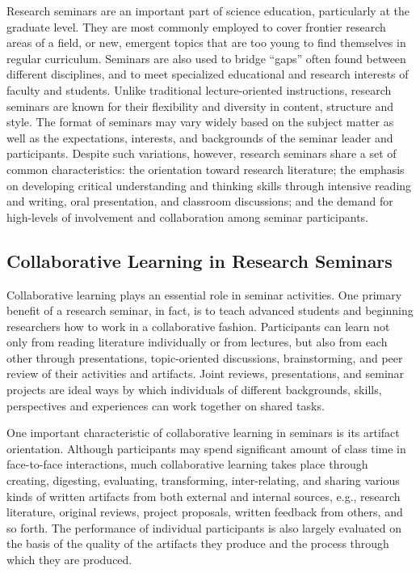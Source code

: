 Research seminars are an important part of science education, particularly
at the graduate level. They are most commonly employed to cover frontier
research areas of a field, or new, emergent topics that are too young to
find themselves in regular curriculum.  Seminars are also used to bridge
``gaps'' often found between different disciplines, and to meet specialized
educational and research interests of faculty and students. Unlike
traditional lecture-oriented instructions, research seminars are known for
their flexibility and diversity in content, structure and style. The format
of seminars may vary widely based on the subject matter as well as the
expectations, interests, and backgrounds of the seminar leader and
participants. Despite such variations, however, research seminars share a
set of common characteristics: the orientation toward research literature;
the emphasis on developing critical understanding and thinking skills
through intensive reading and writing, oral presentation, and classroom
discussions; and the demand for high-levels of involvement and
collaboration among seminar participants.


\subsection{Collaborative Learning in Research Seminars}

Collaborative learning plays an essential role in seminar activities. One
primary benefit of a research seminar, in fact, is to teach advanced
students and beginning researchers how to work in a collaborative fashion.
Participants can learn not only from reading literature individually or
from lectures, but also from each other through presentations,
topic-oriented discussions, brainstorming, and peer review of their
activities and artifacts. Joint reviews, presentations, and seminar
projects are ideal ways by which individuals of different backgrounds,
skills, perspectives and experiences can work together on shared tasks.

One important characteristic of collaborative learning in seminars is its
artifact orientation. Although participants may spend significant amount of
class time in face-to-face interactions, much collaborative learning takes
place through creating, digesting, evaluating, transforming,
inter-relating, and sharing various kinds of written artifacts from both
external and internal sources, e.g., research literature, original reviews,
project proposals, written feedback from others, and so forth. The
performance of individual participants is also largely evaluated on the
basis of the quality of the artifacts they produce and the process through
which they are produced.

